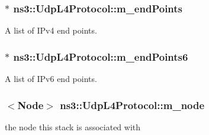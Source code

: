 \subsubsection[{\texorpdfstring{m\+\_\+end\+Points}{m_endPoints}}]{$\ast$ ns3\+::\+Udp\+L4\+Protocol\+::m\+\_\+end\+Points\hspace{0.3cm}{\ttfamily [private]}}\hypertarget{classns3_1_1UdpL4Protocol_a3bde93d3afb318d7e0b4a7b3d3a58e7c}{}\label{classns3_1_1UdpL4Protocol_a3bde93d3afb318d7e0b4a7b3d3a58e7c}


A list of I\+Pv4 end points. 

\subsubsection[{\texorpdfstring{m\+\_\+end\+Points6}{m_endPoints6}}]{$\ast$ ns3\+::\+Udp\+L4\+Protocol\+::m\+\_\+end\+Points6\hspace{0.3cm}{\ttfamily [private]}}\hypertarget{classns3_1_1UdpL4Protocol_a30ee62ced3762babc55527297cbff077}{}\label{classns3_1_1UdpL4Protocol_a30ee62ced3762babc55527297cbff077}


A list of I\+Pv6 end points. 

\subsubsection[{\texorpdfstring{m\+\_\+node}{m_node}}]{$<${\bf Node}$>$ ns3\+::\+Udp\+L4\+Protocol\+::m\+\_\+node\hspace{0.3cm}{\ttfamily [private]}}\hypertarget{classns3_1_1UdpL4Protocol_a3b659100db66be53351016f3875ba62a}{}\label{classns3_1_1UdpL4Protocol_a3b659100db66be53351016f3875ba62a}


the node this stack is associated with 

